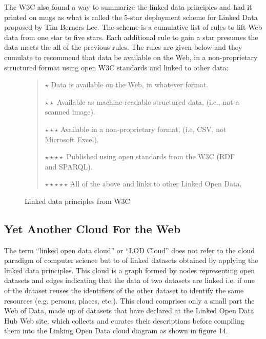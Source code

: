 The W3C also found a way to summarize the linked data principles and had
it printed on mugs as what is called the 5-star deployment scheme for
Linked Data proposed by Tim Berners-Lee. The scheme is a cumulative list
of rules to lift Web data from one star to five stars. Each additional
rule to gain a star presumes the data meets the all of the previous
rules. The rules are given below and they cumulate to recommend that
data be available on the Web, in a non-proprietary structured format
using open W3C standards and linked to other data:

\begin{figure}
\begin{quote}
$\star{}$ Data is available on the Web, in whatever format.

$\star{}\star{}$ Available as machine-readable structured data, (i.e., not a scanned
image).

$\star\star\star$ Available in a non-proprietary format, (i.e, CSV, not Microsoft
Excel).

$\star\star\star\star$ Published using open standards from the W3C (RDF and SPARQL).

$\star\star\star\star\star$ All of the above and links to other Linked Open Data.
\end{quote}
\caption{Linked data principles from W3C}
\label{fig:ch5.13}
\end{figure}


\hypertarget{yet-another-cloud-for-the-web}{%
\subsection{Yet Another Cloud For the
Web}\label{yet-another-cloud-for-the-web}}

The term ``linked open data cloud'' or ``LOD Cloud'' does not refer to
the cloud paradigm of computer science but to of linked datasets
obtained by applying the linked data principles. This cloud is a graph
formed by nodes representing open datasets and edges indicating that the
data of two datasets are linked i.e. if one of the dataset reuses the
identifiers of the other dataset to identify the same resources (e.g.
persons, places, etc.). This cloud comprises only a small part the Web
of Data, made up of datasets that have declared at the Linked Open Data
Hub Web site, which collects and curates their descriptions before
compiling them into the Linking Open Data cloud diagram as shown in
figure 14.

